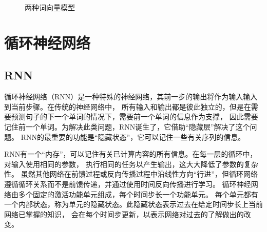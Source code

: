 \begin{figure}[htbp]
  \centering
  \caption{两种词向量模型\cite{mikolov2013distributed}}
  \end{figure}

\section{循环神经网络}

\subsection{RNN}

循环神经网络（RNN）是一种特殊的神经网络，其前一步的输出将作为输入输入到当前步骤\cite{zaremba2014recurrent}。在传统的神经网络中，
所有输入和输出都是彼此独立的，但是在需要预测句子的下一个单词的情况下，需要前一个单词的信息作为支撑，
因此需要记住前一个单词。为解决此类问题，RNN诞生了，它借助“隐藏层”解决了这个问题。
RNN的最重要的功能是“隐藏状态”，它可以记住一些有关序列的信息。

RNN有一个“内存”，可以记住有关已计算内容的所有信息。在每一层的循环中，对输入使用相同的参数，
执行相同的任务以产生输出，这大大降低了参数的复杂性\cite{liu2016recurrent}。
虽然其他网络在前馈过程或反向传播过程中沿线性方向“行进”，但循环网络遵循循环关系而不是前馈传递，并通过使用时间反向传播进行学习。
循环神经网络由多个固定的激活功能单元组成，每个时间步长一个功能单元。
每个单元都有一个内部状态，称为单元的隐藏状态。此隐藏状态表示过去在给定时间步长上当前网络已掌握的知识，
会在每个时间步更新，以表示网络对过去的了解做出的改变。

